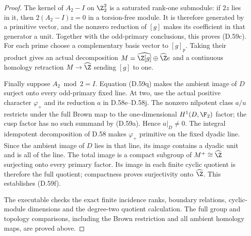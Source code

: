 \begin{proof}
The kernel of $A_2-I$ on $\Z_2^2$ is a saturated
rank-one submodule: if $2z$ lies in it, then
$2(A_2-I)z=0$ in a torsion-free module.
It is therefore generated by a primitive vector,
and the nonzero reduction of $[g]$ makes its
coefficient in that generator a unit.
Together with the odd-primary conclusions, this
proves (D.59c).
For each prime choose a complementary basis vector
to $[g]_p$. Taking their product gives an actual
decomposition $M=\widehat\Z[g]\oplus\widehat\Z e$
and a continuous homology retraction
$M\to\widehat\Z$ sending $[g]$ to one.

Finally suppose $A_2\bmod2=I$.
Equation (D.59q) makes the ambient image of $D$
surject onto every odd-primary fixed line.
At two, use the actual positive character
$\varphi_+$ and its reduction $a$ in D.58e--D.58j.
The nonzero nilpotent class $a/u$ restricts under
the full Brown map to the one-dimensional
$H^1(D,\F_2)$ factor; the cusp factor has no such
summand by (D.59a). Hence $a|_D\ne0$.
The integral idempotent decomposition of D.58
makes $\varphi_+$ primitive on the fixed dyadic
line. Since the ambient image of $D$ lies in
that line, its image contains a dyadic unit
and is all of the line.
The total image is a compact subgroup of
$M^+\cong\widehat\Z$ surjecting onto every primary
factor. Its image in each finite cyclic quotient
is therefore the full quotient; compactness
proves surjectivity onto $\widehat\Z$.
This establishes (D.59f).

The executable
checks the exact finite incidence ranks, boundary
relations, cyclic-module dimensions and the
degree-two quotient calculation. The full group
and topology comparisons, including the Brown
restriction and all ambient homology maps, are
proved above.
\end{proof}
